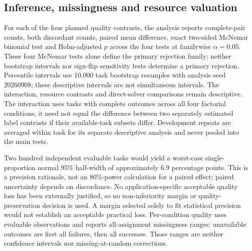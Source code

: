 \subsection{Inference, missingness and resource valuation}
For each of the four planned quality contrasts, the analysis reports complete-pair counts, both discordant counts, paired mean difference, exact two-sided McNemar binomial test and Holm-adjusted $p$ across the four tests at familywise $\alpha=0.05$. These four McNemar tests alone define the primary rejection family; neither bootstrap intervals nor sign-flip sensitivity tests determine a primary rejection. Percentile intervals use 10,000 task bootstrap resamples with analysis seed 20260908; these descriptive intervals are not simultaneous intervals. The interaction, resource contrasts and direct-solver comparisons remain descriptive. The interaction uses tasks with complete outcomes across all four factorial conditions; it need not equal the difference between two separately estimated label contrasts if their available-task subsets differ. Development repeats are averaged within task for its separate descriptive analysis and never pooled into the main tests.

Two hundred independent evaluable tasks would yield a worst-case single-proportion normal 95\% half-width of approximately 6.9 percentage points. This is a precision rationale, not an 80\%-power calculation for a paired effect; paired uncertainty depends on discordance. No application-specific acceptable quality loss has been externally justified, so no non-inferiority margin or quality-preservation decision is used. A margin selected solely to fit statistical precision would not establish an acceptable practical loss. Per-condition quality uses evaluable observations and reports all-assignment missingness ranges: unavailable outcomes are first all failures, then all successes. Those ranges are neither confidence intervals nor missing-at-random corrections.

